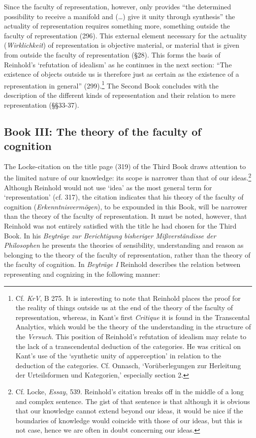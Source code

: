 Since the faculty of representation, however, only provides ``the determined possibility to receive a manifold and (\ldots ) give it unity through synthesis'' the actuality of representation requires something more, something outside the faculty of representation (296). This external element necessary for the actuality (\textit{Wirklichkeit}) of representation is objective material, or material that is given from outside the faculty of representation (\S  28). This forms the basis of Reinhold's `refutation of idealism' as he continues in the next section: ``The existence of objects outside us is therefore just as certain as the existence of a representation in general'' (299).\footnote{ Cf. \textit{KrV}, B 275. It is interesting to note that Reinhold places the proof for the reality of things outside us at the end of the theory of the faculty of representation, whereas, in Kant's first \textit{Critique} it is found in the Transcental Analytics, which would be the theory of the understanding in the structure of the \textit{Versuch}. This position of Reinhold's refutation of idealism may relate to the lack of a transcendental deduction of the categories. He was critical on Kant's use of the `synthetic unity of apperception' in relation to the deduction of the categories. Cf. Onnasch, `Vor\"{u}berlegungen zur Herleitung der Urteilsformen und Kategorien,' especially section 2.} The Second Book concludes with the description of the different kinds of representation and their relation to mere representation (\S \S  33{-}37).


\subsection{Book III: The theory of the faculty of cognition}


The Locke{-}citation on the title page (319) of the Third Book draws attention to the limited nature of our knowledge: its scope is narrower than that of our ideas.\footnote{ Cf. Locke, \textit{Essay}, 539. Reinhold's citation breaks off in the middle of a long and complex sentence. The gist of that sentence is that although it is obvious that our knowledge cannot extend beyond our ideas, it would be nice if the boundaries of knowledge would coincide with those of our ideas, but this is not case, hence we are often in doubt concerning our ideas. } Although Reinhold would not use `idea' as the most general term for `representation' (cf. 317), the citation indicates that his theory of the faculty of cognition (\textit{Erkenntnisverm\"{o}gen}), to be expounded in this Book, will be narrower than the theory of the faculty of representation. It must be noted, however, that Reinhold was not entirely satisfied with the title he had chosen for the Third Book. In his \textit{Beytr\"{a}ge zur Berichtigung bisheriger Mi\ss{}verst\"{a}ndisse der Philosophen} he presents the theories of sensibility, understanding and reason as belonging to the theory of the faculty of representation, rather than the theory of the faculty of cognition. In \textit{Beytr\"{a}ge I }Reinhold describes the relation between representing and cognizing in the following manner: 

